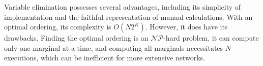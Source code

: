 Variable elimination possesses several advantages, including its simplicity of implementation and the faithful representation of manual calculations. 
With an optimal ordering, its complexity is $O(N2^K)$.
However, it does have its drawbacks. 
Finding the optimal ordering is an $\mathcal{NP}$-hard problem, it can compute only one marginal at a time, and computing all marginals necessitates $N$ executions, which can be inefficient for more extensive networks.